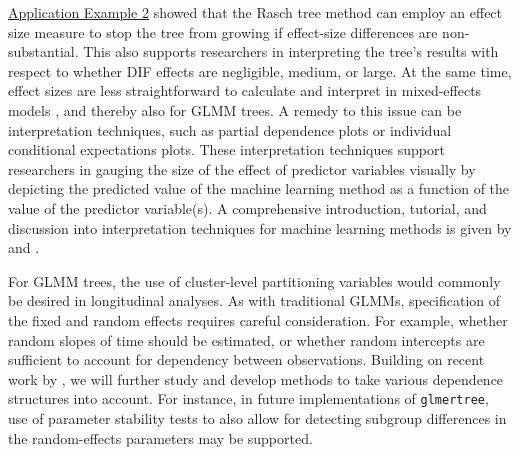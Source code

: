 \documentclass[doc,floatsintext,natbib]{apa7}
\begin{document}
\hyperref[sec:TutorialRasch]{Application Example 2} showed that the Rasch tree method can employ an effect size measure to stop the tree from growing if effect-size differences are non-substantial. This also supports researchers in interpreting the tree's results with respect to whether DIF effects are negligible, medium, or large. At the same time, effect sizes are less straightforward to calculate and interpret in mixed-effects models \citep{JuddyWest17}, and thereby also for GLMM trees. A remedy to this issue can be interpretation techniques, such as partial dependence plots or individual conditional expectations plots. These interpretation techniques support researchers in gauging the size of the effect of predictor variables visually by depicting the predicted value of the machine learning method as a function of the value of the predictor variable(s). A comprehensive introduction, tutorial, and discussion into interpretation techniques for machine learning methods is given by \cite{Molnar2019} and \cite{Henninger2022c}. 

For GLMM trees, the use of cluster-level partitioning variables would commonly be desired in longitudinal analyses. As with traditional GLMMs, specification of the fixed and random effects requires careful consideration. For example, whether random slopes of time should be estimated, or whether random intercepts are sufficient to account for dependency between observations. Building on recent work by \citet{FokkyZeil23}, we will further study and develop methods to take various dependence structures into account. For instance, in future implementations of \texttt{glmertree}, use of parameter stability tests to also allow for detecting subgroup differences in the random-effects parameters \citep{Wang2021a} may be supported.


\end{document}

